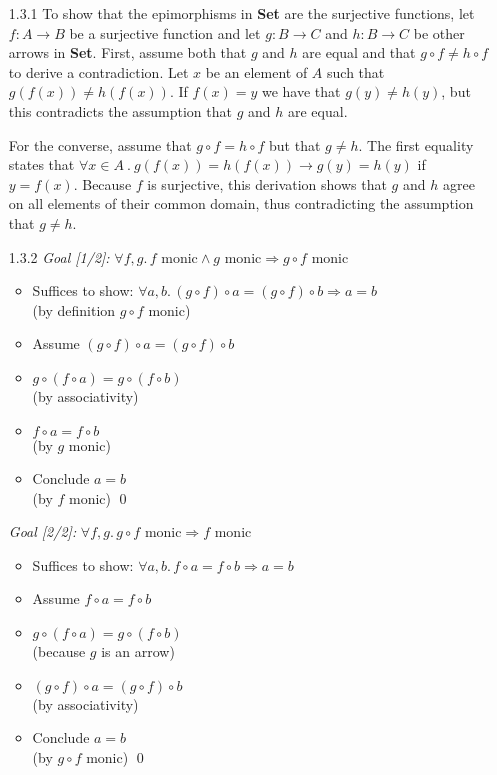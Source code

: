 \documentclass{article}
\begin{document}
\begin{enumerate}
\item[1.3.1]
  To show that the epimorphisms in \textbf{Set} are the surjective functions, let $f : A \rightarrow B$ be a surjective function and let $g : B \rightarrow C$ and $h : B \rightarrow C$ be other arrows in \textbf{Set}.
  First, assume both that $g$ and $h$ are equal and that $g \circ f \ne h \circ f$ to derive a contradiction.
  Let $x$ be an element of $A$ such that $g(f(x)) \ne h(f(x))$.
  If $f(x) = y$ we have that $g(y) \ne h(y)$, but this contradicts the assumption that $g$ and $h$ are equal.

  For the converse, assume that $g \circ f = h \circ f$ but that $g \ne h$.
  The first equality states that $\forall x\in A~.~g(f(x)) = h(f(x)) \rightarrow g(y) = h(y)$ if $y = f(x)$.
  Because $f$ is surjective, this derivation shows that $g$ and $h$ agree on all elements of their common domain, thus contradicting the assumption that $g \ne h$.

\item [1.3.2]
  \emph{Goal [1/2]:} $\forall f, g .\,f \mbox{ monic} \wedge g \mbox{ monic} \Rightarrow g \circ f \mbox{ monic}$
  \begin{itemize}
  \item
    Suffices to show: $\forall a, b .\,(g \circ f) \circ a = (g \circ f) \circ b \Rightarrow a = b$
    \\ (by definition $g \circ f$ monic)
  \item
    Assume $(g \circ f) \circ a = (g \circ f) \circ b$
  \item
    $g \circ (f \circ a) = g \circ (f \circ b)$
    \\ (by associativity)
  \item
    $f \circ a = f \circ b$
    \\ (by $g$ monic)
  \item
    Conclude $a = b$
    \\ (by $f$ monic) \qed
  \end{itemize}

\item[]
  \emph{Goal [2/2]:} $\forall f,g .\,g \circ f \mbox{ monic} \Rightarrow f \mbox{ monic}$
  \begin{itemize}
  \item
    Suffices to show: $\forall a, b .\,f \circ a = f \circ b \Rightarrow a = b$
  \item
    Assume $f \circ a = f \circ b$
  \item
    $g \circ (f \circ a) = g \circ (f \circ b)$
    \\ (because $g$ is an arrow)
  \item
    $(g \circ f) \circ a = (g \circ f) \circ b$
    \\ (by associativity)
  \item
    Conclude $a = b$
      \\ (by $g \circ f$ monic) \qed
  \end{itemize}



\end{enumerate}
\end{document}
